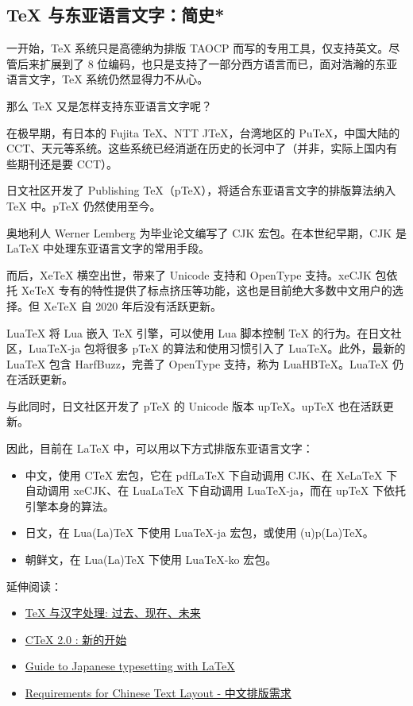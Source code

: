 \documentclass[a4paper,fontset=none]{ctexart}
\begin{document}
\subsection{TeX 与东亚语言文字：简史*}

一开始，TeX 系统只是高德纳为排版 TAOCP 而写的专用工具，仅支持英文。尽管后来扩展到了 8 位编码，也只是支持了一部分西方语言而已，面对浩瀚的东亚语言文字，TeX 系统仍然显得力不从心。

那么 TeX 又是怎样支持东亚语言文字呢？

在极早期，有日本的 Fujita TeX、NTT JTeX，台湾地区的 PuTeX，中国大陆的 CCT、天元等系统。这些系统已经消逝在历史的长河中了（并非，实际上国内有些期刊还是要 CCT）。

日文社区开发了 Publishing TeX（pTeX），将适合东亚语言文字的排版算法纳入 TeX 中。pTeX 仍然使用至今。

奥地利人 Werner Lemberg 为毕业论文编写了 CJK 宏包。在本世纪早期，CJK 是 LaTeX 中处理东亚语言文字的常用手段。

而后，XeTeX 横空出世，带来了 Unicode 支持和 OpenType 支持。xeCJK 包依托 XeTeX 专有的特性提供了标点挤压等功能，这也是目前绝大多数中文用户的选择。但 XeTeX 自 2020 年后没有活跃更新。

LuaTeX 将 Lua 嵌入 TeX 引擎，可以使用 Lua 脚本控制 TeX 的行为。在日文社区，LuaTeX-ja 包将很多 pTeX 的算法和使用习惯引入了 LuaTeX。此外，最新的 LuaTeX 包含 HarfBuzz，完善了 OpenType 支持，称为 LuaHBTeX。LuaTeX 仍在活跃更新。

与此同时，日文社区开发了 pTeX 的 Unicode 版本 upTeX。upTeX 也在活跃更新。

因此，目前在 LaTeX 中，可以用以下方式排版东亚语言文字：

\begin{itemize}
    \item 中文，使用 CTeX 宏包，它在 pdfLaTeX 下自动调用 CJK、在 XeLaTeX 下自动调用 xeCJK、在 LuaLaTeX 下自动调用 LuaTeX-ja，而在 upTeX 下依托引擎本身的算法。
    \item 日文，在 Lua(La)TeX 下使用 LuaTeX-ja 宏包，或使用 (u)p(La)TeX。
    \item 朝鲜文，在 Lua(La)TeX 下使用 LuaTeX-ko 宏包。
\end{itemize}

延伸阅读：

\begin{itemize}
    \item \href{https://tuna.moe/assets/slides/doc-ptex-ng-zh.pdf}{TeX 与汉字处理: 过去、现在、未来}
    \item \href{https://tuna.moe/assets/slides/ctex2talk.pdf}{CTeX 2.0 : 新的开始}
    \item \href{http://mirrors.ctan.org/macros/latex/contrib/babel-contrib/japanese/japanese.pdf}{Guide to Japanese typesetting with LaTeX}
    \item \href{https://www.w3.org/TR/clreq/}{Requirements for Chinese Text Layout - 中文排版需求}
\end{itemize}
\end{document}
